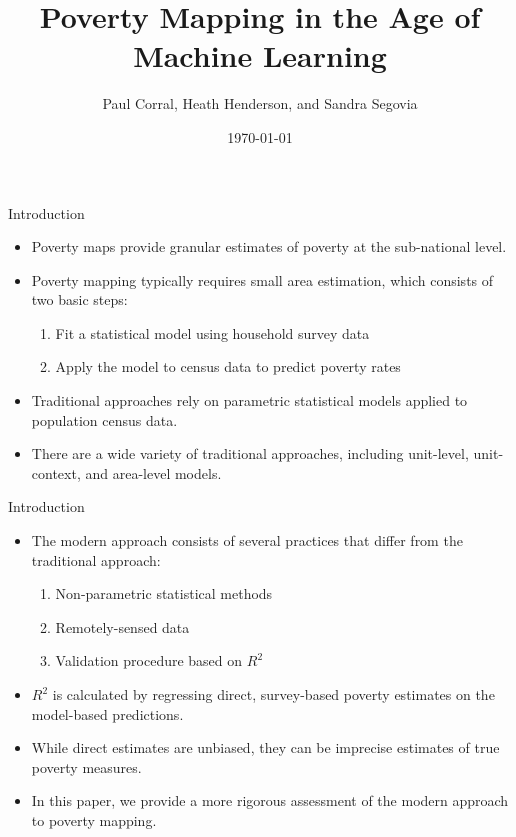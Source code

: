 \documentclass[aspectratio=169, xcolor=dvipsnames]{beamer}
\title[]{Poverty Mapping in the Age of Machine Learning}
\date{\today}
\author[]{Paul Corral, Heath Henderson, and Sandra Segovia}
\begin{document}

\begin{frame}
\titlepage
\end{frame}

\begin{frame}{Introduction}
\begin{itemize}
\item Poverty maps provide granular estimates of poverty at the sub-national level.
\par\pause\noindent
\item Poverty mapping typically requires small area estimation, which consists of 
two basic steps:
\begin{enumerate}
\item Fit a statistical model using household survey data
\item Apply the model to census data to predict poverty rates
\end{enumerate}
\par\pause\noindent
\item Traditional approaches rely on parametric statistical models applied 
to population census data.
\par\pause\noindent
\item There are a wide variety of traditional approaches, including unit-level,
unit-context, and area-level models.
\end{itemize}
\end{frame}

\begin{frame}{Introduction}
\begin{itemize}
\item The modern approach consists of several practices that differ from the 
traditional approach:
\begin{enumerate}
\item Non-parametric statistical methods
\item Remotely-sensed data
\item Validation procedure based on $R^2$
\end{enumerate}
\par\pause\noindent
\item $R^2$ is calculated by regressing direct, survey-based poverty estimates 
on the model-based predictions.
\par\pause\noindent
\item While direct estimates are unbiased, they can be imprecise estimates of 
true poverty measures.
\par\pause\noindent
\item In this paper, we provide a more rigorous assessment of the modern 
approach to poverty mapping.
\end{itemize}
\end{frame}
\end{document}
